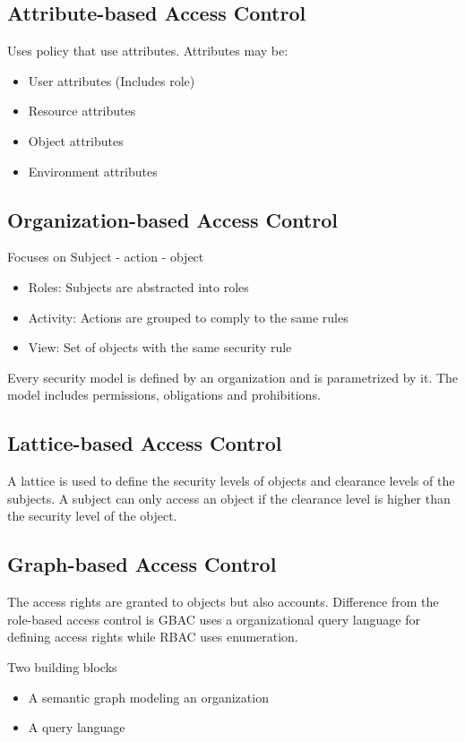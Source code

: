 \documentclass[11pt]{article} %
\begin{document}
\subsection{Attribute-based Access Control}

Uses policy that use attributes. Attributes may be:
\begin{itemize}		
\item User attributes (Includes role)
\item Resource attributes
\item Object attributes
\item Environment attributes
\end{itemize}

\subsection{Organization-based Access Control}
Focuses on Subject - action - object 
\begin{itemize}		
\item Roles: Subjects are abstracted into roles
\item Activity: Actions are grouped to comply to the same rules
\item View: Set of objects with the same security rule
\end{itemize}
Every security model is defined by an organization and is parametrized by it.
The model includes permissions, obligations and prohibitions.


\subsection{Lattice-based Access Control}

A lattice is used to define the security levels of objects and clearance levels of the subjects.
A subject can only access an object if the clearance level is higher than the security level of the object.


\subsection{Graph-based Access Control}
The access rights are granted to objects but also accounts.
Difference from the  role-based access control is GBAC uses a organizational query language for defining access rights while RBAC uses enumeration.

Two building blocks
\begin{itemize}		
\item A semantic graph modeling an organization
\item A query language
\end{itemize}
\end{document}
